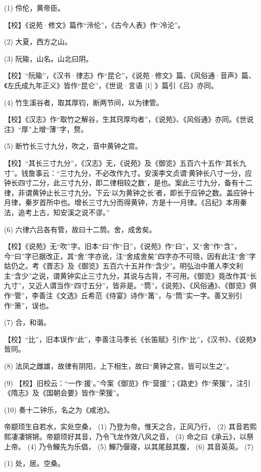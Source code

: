 \documentclass[12pt,UTF8]{ctexbook}
\begin{document}
(1) 伶伦，黄帝臣。

【校】《说苑·修文》篇作“泠伦”，《古今人表》作“冷沦”。

(2) 大夏，西方之山。

(3) 阮隃，山名。山北曰阴。

【校】“阮隃”，《汉书·律志》作“昆仑”，《说苑·修文》篇、《风俗通·音声》篇、《左氏成九年正义》皆作“昆仑”，《世说·言语 [1] 》篇引《吕》亦同。

(4) 竹生溪谷者，取其厚钧，断两节间，以为律管。

【校】《汉志》作“取竹之解谷，生其窍厚均者”，《说苑》、《风俗通》亦同。《世说注》“厚”上增“薄”字，赘。

(5) 断竹长三寸九分，吹之，音中黄钟之宫。

【校】“其长三寸九分”，《汉志》无，《说苑》及《御览》五百六十五作“其长九寸”。钱詹事云：“三寸九分，不必改作九寸。安溪李文贞谓‘黄钟长八寸一分，应钟长四寸二分，此三寸九分，即二律相较之数’，是也。案此三寸九分，备有十二律，非谓黄钟止长三寸九分。下云‘以为黄钟之长’者，即长于应钟之数。盖应钟十月律，秦岁首所中也。增长三寸九分而得黄钟，方是十一月律。《吕纪》本用秦法，追考上古，知安溪之说不谬。”

(6) 六律六吕各有管，故曰十二筒。舍，成舍矣。

【校】《说苑》无“吹”字。旧本“曰”作“日”，《说苑》作“曰”，又“舍”作“含”，今“曰”字已据改正，其“舍”字亦讹，注“舍成舍矣”四字亦不可晓，因有此注“舍”字姑仍之。考《晋志》及《御览》五百六十五并作“含少”。明弘治中莆人李文利主“含少”之说，谓黄钟实止三寸九分，其说与古背，不可用。《御览》竟改作其“长九寸”，又近人谓当作“四寸五分”，皆非是。“筒”，《说苑》、《风俗通》、《御览》俱作“管”，李善注《文选》丘希范《侍宴》诗作“筩”，与“筒”实一字。善又别引作“箫”，误也。

(7) 合，和谐。

【校】“比”，旧本误作“此”，李善注马季长《长笛赋》引作“比”，《汉书》、《说苑》皆同。

(8) 法凤之雌雄，故律有阴阳，上下相生，故曰“黄钟之宫，皆可以生之”。

(9) 【校】旧校云：“一作‘援’。”今案《御览》作“营援”；《路史》作“荣猨”，注引《隋志》及《国朝会要》皆作“荣猨”。

(10) 奏十二钟乐，名之为《咸池》。

帝颛顼生自若水，实处空桑， (1) 乃登为帝。惟天之合，正风乃行， (2) 其音若熙熙凄凄锵锵。帝颛顼好其音，乃令飞龙作效八风之音， (3) 命之曰《承云》，以祭上帝。 (4) 乃令鱓先为乐倡， (5) 鱓乃偃寝，以其尾鼓其腹， (6) 其音英英。 (7)

(1) 处，居。空桑。
\end{document}
